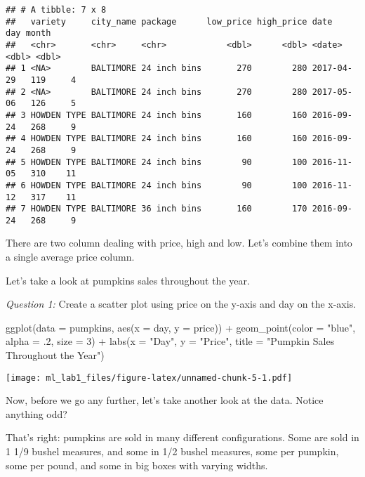 \documentclass[
]{article}
\newenvironment{Shaded}{\begin{snugshade}}{\end{snugshade}}
\newcommand{\AttributeTok}[1]{\textcolor[rgb]{0.77,0.63,0.00}{#1}}
\newcommand{\DecValTok}[1]{\textcolor[rgb]{0.00,0.00,0.81}{#1}}
\newcommand{\FunctionTok}[1]{\textcolor[rgb]{0.00,0.00,0.00}{#1}}
\newcommand{\NormalTok}[1]{#1}
\newcommand{\SpecialCharTok}[1]{\textcolor[rgb]{0.00,0.00,0.00}{#1}}
\newcommand{\StringTok}[1]{\textcolor[rgb]{0.31,0.60,0.02}{#1}}
\begin{document}
\begin{verbatim}
## # A tibble: 7 x 8
##   variety     city_name package      low_price high_price date         day month
##   <chr>       <chr>     <chr>            <dbl>      <dbl> <date>     <dbl> <dbl>
## 1 <NA>        BALTIMORE 24 inch bins       270        280 2017-04-29   119     4
## 2 <NA>        BALTIMORE 24 inch bins       270        280 2017-05-06   126     5
## 3 HOWDEN TYPE BALTIMORE 24 inch bins       160        160 2016-09-24   268     9
## 4 HOWDEN TYPE BALTIMORE 24 inch bins       160        160 2016-09-24   268     9
## 5 HOWDEN TYPE BALTIMORE 24 inch bins        90        100 2016-11-05   310    11
## 6 HOWDEN TYPE BALTIMORE 24 inch bins        90        100 2016-11-12   317    11
## 7 HOWDEN TYPE BALTIMORE 36 inch bins       160        170 2016-09-24   268     9
\end{verbatim}

There are two column dealing with price, high and low. Let's combine
them into a single average price column.

Let's take a look at pumpkins sales throughout the year.

\emph{Question 1:} Create a scatter plot using price on the y-axis and
day on the x-axis.

\begin{Shaded}
\begin{Highlighting}[]
\FunctionTok{ggplot}\NormalTok{(}\AttributeTok{data =}\NormalTok{ pumpkins, }\FunctionTok{aes}\NormalTok{(}\AttributeTok{x =}\NormalTok{ day, }\AttributeTok{y =}\NormalTok{ price)) }\SpecialCharTok{+} \FunctionTok{geom\_point}\NormalTok{(}\AttributeTok{color =} \StringTok{"blue"}\NormalTok{, }
             \AttributeTok{alpha =}\NormalTok{ .}\DecValTok{2}\NormalTok{, }
             \AttributeTok{size =} \DecValTok{3}\NormalTok{) }\SpecialCharTok{+}
  \FunctionTok{labs}\NormalTok{(}\AttributeTok{x =} \StringTok{"Day"}\NormalTok{, }\AttributeTok{y =} \StringTok{"Price"}\NormalTok{, }\AttributeTok{title =} \StringTok{"Pumpkin Sales Throughout the Year"}\NormalTok{)}
\end{Highlighting}
\end{Shaded}

\texttt{[image: ml\_lab1\_files/figure-latex/unnamed-chunk-5-1.pdf]}

Now, before we go any further, let's take another look at the data.
Notice anything odd?

That's right: pumpkins are sold in many different configurations. Some
are sold in 1 1/9 bushel measures, and some in 1/2 bushel measures, some
per pumpkin, some per pound, and some in big boxes with varying widths.
\end{document}
